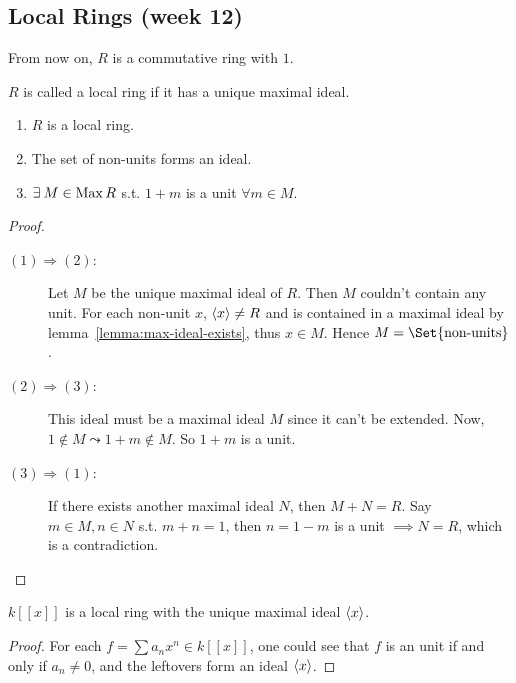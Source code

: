 \subsection{Local Rings (week 12)}

From now on, $R$ is a commutative ring with $1$.

\begin{definition}
  $R$ is called a local ring if it has a unique maximal ideal.
\end{definition}

\begin{prop} \mbox{}
  \begin{enumerate}[(1)]
    \item $R$ is a local ring.
    \item The set of non-units forms an ideal.
    \item $\exists M \in \Max R$ s.t. $1 + m$ is a unit $\forall m \in M$.
  \end{enumerate}

  \begin{proof} \mbox{}
    \begin{description}
      \item[$(1)\Rightarrow(2)$:]
        Let $M$ be the unique maximal ideal of $R$. Then $M$ couldn't contain
        any unit. For each non-unit $x$,
        $\langle x\rangle \neq R$ and is contained in a maximal ideal by
        lemma~\ref{lemma:max-ideal-exists}, thus $x \in M$.
        Hence $M = \Set{ \text{non-units} }$.
      \item[$(2) \Rightarrow (3)$:]
        This ideal must be a maximal ideal $M$ since it can't be extended.
        Now, $1 \notin M \leadsto 1 + m \notin M$. So $1 + m$ is a unit.
      \item[$(3)\Rightarrow(1)$:]
        If there exists another maximal ideal $N$, then $M + N = R$.
        Say $m \in  M, n \in N$ s.t. $m + n = 1$, then $n = 1 - m$ is a unit
        $\implies N = R$, which is a contradiction.
        \qedhere
    \end{description}
  \end{proof}
\end{prop}

\begin{example}
  $k[[x]]$ is a local ring with the unique maximal ideal $\langle x\rangle$.
  \begin{proof}
    For each $f = \sum a_n x^n \in k[[x]]$, one could see that $f$ is
    an unit if and only if $a_n \neq 0$, and the leftovers form an
    ideal $\langle x\rangle$.
  \end{proof}
\end{example}


